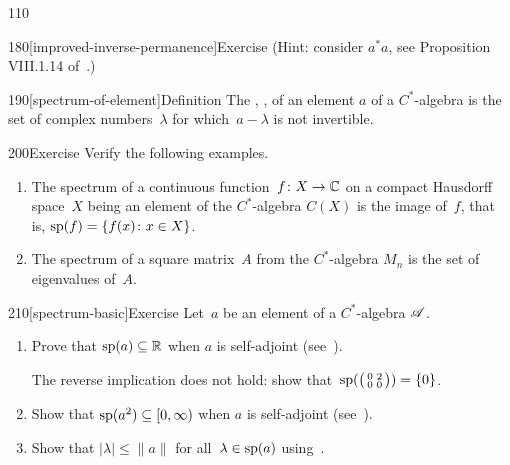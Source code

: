 \begin{parsec}{110}
\begin{point}{180}[improved-inverse-permanence]{Exercise}
(Hint: consider $a^*a$, see Proposition VIII.1.14 of~\cite{conway2013}.)
\end{point}
\begin{point}{190}[spectrum-of-element]{Definition}%
The ,
,%
of an element $a$
of a $C^*$-algebra
is the set 
of complex numbers~$\lambda$
for which~$a-\lambda$ is not invertible.
\end{point}
\begin{point}{200}{Exercise}%
Verify the following examples.
\begin{enumerate}
\item
The spectrum of a continuous function~$f\colon X\to \mathbb{C}$
on a compact Hausdorff space~$X$
being an element of the $C^*$-algebra $C(X)$
is the image of~$f$, that is,
$\mathrm{sp}(f) = \{f(x)\colon x\in X\}$.
\item
The spectrum of a square matrix~$A$
from the $C^*$-algebra $M_n$
is the set of eigenvalues of~$A$.
\end{enumerate}%
\spacingfix%
\end{point}%
\begin{point}{210}[spectrum-basic]{Exercise}%
Let~$a$ be an element of a $C^*$-algebra $\mathscr{A}$.
\begin{enumerate}
\item
Prove that $\mathrm{sp}(a)\subseteq \mathbb{R}$ when $a$ is self-adjoint
(see~).

The reverse implication does not hold:
show that~$\mathrm{sp}(\bigl(
\begin{smallmatrix}0&2\\0&0\end{smallmatrix}\bigr))=\{0\}$.

\item
Show that $\mathrm{sp}(a^2)\subseteq [0,\infty)$ when $a$ is self-adjoint
(see~).

\item
Show that $|\lambda|\leq \|a\|$ for all~$\lambda\in\mathrm{sp}(a)$
using~.


\end{enumerate}
\end{point}
\end{parsec}
